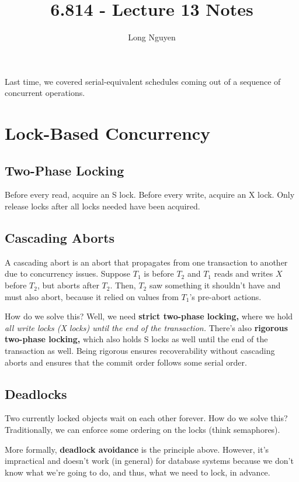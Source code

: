 \documentclass{article}
\title{6.814 - Lecture 13 Notes}
\author{Long Nguyen}
\begin{document}
\maketitle

Last time, we covered serial-equivalent schedules coming out of a sequence of concurrent operations.

\section{Lock-Based Concurrency}

\subsection*{Two-Phase Locking} Before every read, acquire an S lock. Before every write, acquire an X lock. Only release locks after all locks needed have been acquired.

\subsection*{Cascading Aborts} A cascading abort is an abort that propagates from one transaction to another due to concurrency issues. Suppose $T_1$ is before $T_2$ and $T_1$ reads and writes $X$ before $T_2$, but aborts after $T_2$. Then, $T_2$ saw something it shouldn't have and must also abort, because it relied on values from $T_1$'s pre-abort actions.

How do we solve this? Well, we need \textbf{strict two-phase locking,} where we hold \emph{all write locks (X locks) until the end of the transaction.} There's also \textbf{rigorous two-phase locking,} which also holds S locks as well until the end of the transaction as well. Being rigorous ensures recoverability without cascading aborts and ensures that the commit order follows some serial order.

\subsection*{Deadlocks} Two currently locked objects wait on each other forever. How do we solve this? Traditionally, we can enforce some ordering on the locks (think semaphores).

More formally, \textbf{deadlock avoidance} is the principle above. However, it's impractical and doesn't work (in general) for database systems because we don't know what we're going to do, and thus, what we need to lock, in advance.
\end{document}
